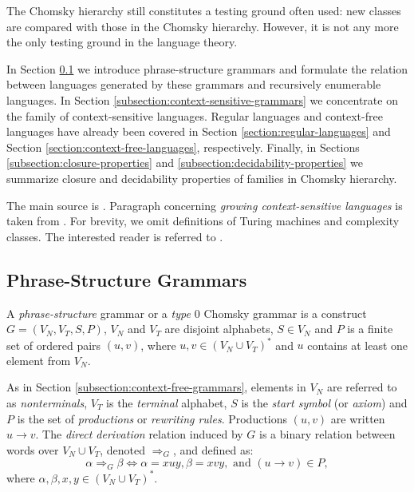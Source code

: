 The Chomsky hierarchy still constitutes a testing ground often used: new classes are compared with those in the Chomsky hierarchy. However, it is not any more the only testing ground in the language theory.

In Section \ref{subsection:phrase-structure-grammars} we introduce phrase-structure grammars and formulate the relation between languages generated by these grammars and  recursively enumerable languages. In Section \ref{subsection:context-sensitive-grammars} we concentrate on the family of context-sensitive languages. Regular languages and context-free languages have already been covered in Section \ref{section:regular-languages} and Section \ref{section:context-free-languages}, respectively. Finally, in Sections \ref{subsection:closure-properties} and \ref{subsection:decidability-properties} we summarize closure and decidability properties of families in Chomsky hierarchy.

The main source is \cite{MaSa1997formal, MaSa1997aspects}. Paragraph concerning \emph{growing context-sensitive 
languages} is taken from \cite{Buntrock19981}. For brevity, we omit definitions of Turing machines and complexity classes. The interested reader is referred to \cite{MaSa1997aspects}.

\subsection{Phrase-Structure Grammars}
\label{subsection:phrase-structure-grammars}

A \emph{phrase-structure} grammar or a \emph{type $0$} Chomsky grammar is a construct $G = (V_N, V_T, S, P)$, $V_N$ and $V_T$ are disjoint alphabets, $S \in V_N$ and $P$ is a finite set of ordered pairs $(u, v)$, where $u, v \in (V_N \cup V_T)^*$ and $u$ contains at least one element from $V_N$.

As in Section \ref{subsection:context-free-grammars}, elements in $V_N$ are referred to as \emph{nonterminals}, $V_T$ is the  \emph{terminal} alphabet, $S$ is the \emph{start symbol} (or \emph{axiom}) and $P$ is the set of  \emph{productions} or \emph{rewriting rules}. Productions $(u, v)$ are written $u \to v$. The \emph{direct derivation} relation induced by $G$ is a binary relation between words over $V_N \cup V_T$, denoted $\Rightarrow_G$, and defined as: 
$$\alpha \Rightarrow_G \beta \Leftrightarrow \alpha = xuy, \beta = xvy, \text{ and } (u \to v) \in P,$$
where $\alpha, \beta, x, y \in (V_N \cup V_T)^*$.

